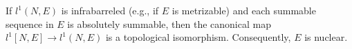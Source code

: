 If $l^1(N, E)$ is infrabarreled (e.g., if $E$ is metrizable) and each summable sequence in $E$ is absolutely summable, then the canonical map $l^1[N, E] \rightarrow l^1(N, E)$ is a topological isomorphism. Consequently, $E$ is nuclear.
